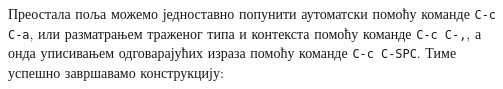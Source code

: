 Преостала поља можемо једноставно попунити аутоматски помоћу команде \texttt{C-c C-a}, или разматрањем траженог типа и контекста помоћу команде \texttt{C-c C-,}, а онда уписивањем одговарајућих израза помоћу команде \texttt{C-c C-SPC}. Тиме успешно завршавамо конструкцију:
\begin{code}%
\>[0]\AgdaSpace{}%
\AgdaSpace{}%
\AgdaSpace{}%
\AgdaSpace{}%
%
\>[29]\AgdaSymbol{=}\AgdaSpace{}%
\<%
\\
\>[0]\AgdaSpace{}%
\AgdaSpace{}%
\AgdaSpace{}%
\AgdaSpace{}%
\AgdaSymbol{(}\AgdaSpace{}%
\AgdaSymbol{)}\AgdaSpace{}%
\AgdaSymbol{=}\AgdaSpace{}%
\AgdaSpace{}%
\AgdaSpace{}%
\AgdaSymbol{(}\AgdaSpace{}%
\AgdaSpace{}%
\AgdaSpace{}%
\AgdaSpace{}%
\AgdaSymbol{)}\<%
\end{code}
